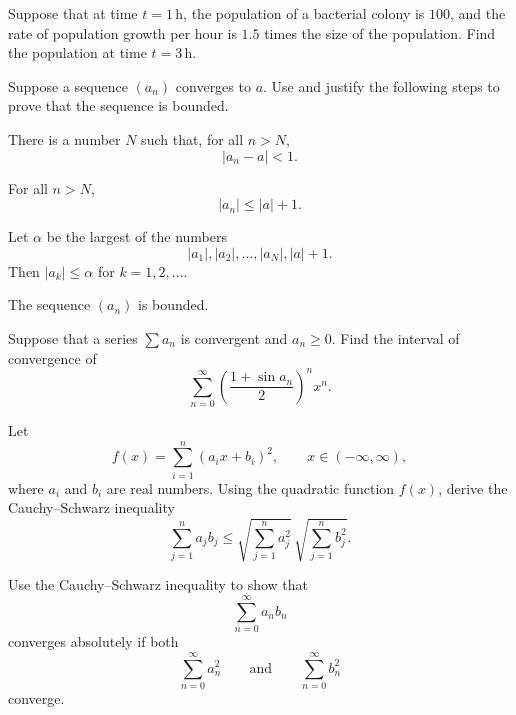 \begin{problem}
Suppose that at time $t=1\,\mathrm{h}$, the population of a bacterial colony is $100$, and the rate of population growth per hour is $1.5$ times the size of the population. Find the population at time $t=3\,\mathrm{h}$.
\end{problem}

\begin{problem}
Suppose a sequence $(a_n)$ converges to $a$. Use and justify the following steps to prove that the sequence is bounded.
\begin{problemsubparts}
\item There is a number $N$ such that, for all $n>N$,
\[
|a_n-a|<1.
\]
\item For all $n>N$,
\[
|a_n|\le |a|+1.
\]
\item Let $\alpha$ be the largest of the numbers
\[
|a_1|, |a_2|, \ldots, |a_N|, |a|+1.
\]
Then $|a_k|\le\alpha$ for $k=1, 2, \ldots$.
\item The sequence $(a_n)$ is bounded.
\end{problemsubparts}
\end{problem}

\begin{problem}
Suppose that a series $\displaystyle\sum a_n$ is convergent and $a_n\ge0$. Find the interval of convergence of
\[
\sum_{n=0}^{\infty}
\left(\frac{1+\sin a_n}{2}\right)^n x^n.
\]
\end{problem}

\begin{problem}
\begin{problemsubparts}
\item Let
\[
f(x)=\sum_{i=1}^{n}(a_i x+b_i)^2,
\qquad x\in(-\infty, \infty),
\]
where $a_i$ and $b_i$ are real numbers. Using the quadratic function $f(x)$, derive the Cauchy--Schwarz inequality
\[
\sum_{j=1}^{n}a_jb_j
\le
\sqrt{\sum_{j=1}^{n}a_j^2}\,
\sqrt{\sum_{j=1}^{n}b_j^2}.
\]
\item Use the Cauchy--Schwarz inequality to show that
\[
\sum_{n=0}^{\infty}a_nb_n
\]
converges absolutely if both
\[
\sum_{n=0}^{\infty}a_n^2
\qquad\text{and}\qquad
\sum_{n=0}^{\infty}b_n^2
\]
converge.
\end{problemsubparts}
\end{problem}

